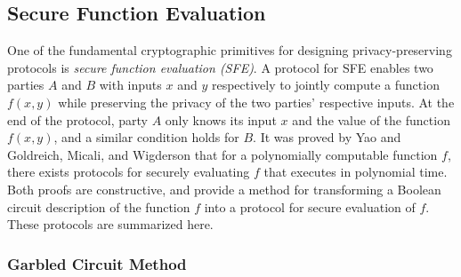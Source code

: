 \subsection{Secure Function Evaluation}

One of the fundamental cryptographic primitives for designing privacy-preserving
protocols is \textit{secure function evaluation (SFE)}. A protocol
for SFE enables two parties $A$ and $B$ with inputs $x$ and $y$
respectively to jointly compute a function $f(x,y)$ while preserving
the privacy of the two parties' respective inputs. At the end of the
protocol, party $A$ only knows its input $x$ and the value of the
function $f(x,y)$, and a similar condition holds for $B$. It was
proved by Yao \cite{Yao86} and Goldreich, Micali, and Wigderson \cite{GMW87}
that for a polynomially computable function $f$, there exists protocols
for securely evaluating $f$ that executes in polynomial time. Both
proofs are constructive, and provide a method for transforming a Boolean
circuit description of the function $f$ into a protocol for secure
evaluation of $f$. These protocols are summarized here.


\subsubsection{Garbled Circuit Method \label{sub:Garbled-Circuit-Method}}

